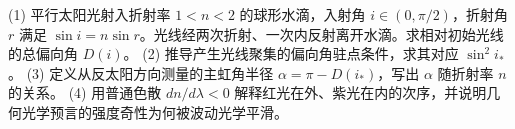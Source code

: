 (1) 平行太阳光射入折射率 \(1<n<2\) 的球形水滴，入射角 \(i\in(0,\pi/2)\)，折射角 \(r\) 满足 \(\sin i=n\sin r\)。光线经两次折射、一次内反射离开水滴。求相对初始光线的总偏向角 \(D(i)\)。
(2) 推导产生光线聚集的偏向角驻点条件，求其对应 \(\sin^2 i_*\)。
(3) 定义从反太阳方向测量的主虹角半径 \(\alpha=\pi-D(i_*)\)，写出 \(\alpha\) 随折射率 \(n\) 的关系。
(4) 用普通色散 \(dn/d\lambda<0\) 解释红光在外、紫光在内的次序，并说明几何光学预言的强度奇性为何被波动光学平滑。
